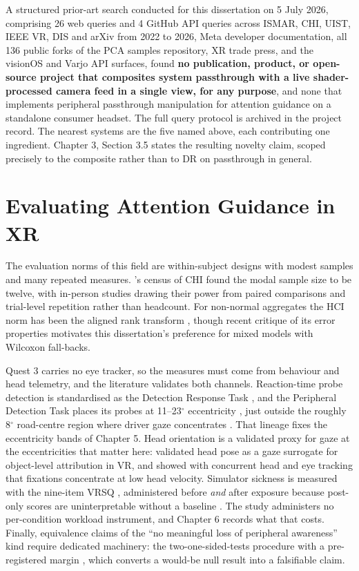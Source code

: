 A structured prior-art search conducted for this dissertation on 5 July 2026, comprising 26 web
queries and 4 GitHub API queries across ISMAR, CHI, UIST, IEEE VR, DIS and arXiv from 2022 to 2026,
Meta developer documentation, all 136 public forks of the PCA samples repository, XR trade press, and
the visionOS and Varjo API surfaces, found \textbf{no publication, product, or open-source project
that composites system passthrough with a live shader-processed camera feed in a single view, for any
purpose}, and none that implements peripheral passthrough manipulation for attention guidance on a
standalone consumer headset. The full query protocol is archived in the project record. The nearest
systems are the five named above, each contributing one ingredient. Chapter 3, Section 3.5 states the
resulting novelty claim, scoped precisely to the composite rather than to DR on passthrough in
general.

\section{Evaluating Attention Guidance in XR}

The evaluation norms of this field are within-subject designs with modest samples and many
repeated measures. \citet{caine2016}'s census of CHI found the modal sample size to be twelve, with
in-person studies drawing their power from paired comparisons and trial-level repetition rather than
headcount. For non-normal aggregates the HCI norm has been the aligned rank transform
\citep{wobbrock2011}, though recent critique of its error properties \citep{tsandilas2024} motivates
this dissertation's preference for mixed models with Wilcoxon fall-backs.

Quest 3 carries no eye tracker, so the measures must come from behaviour and head telemetry, and the
literature validates both channels. Reaction-time probe detection is standardised as the Detection
Response Task \citep{iso2016}, and the Peripheral Detection Task places its probes at
11--23$^{\circ}$ eccentricity \citep{jahn2005}, just outside the roughly 8$^{\circ}$ road-centre
region where driver gaze concentrates \citep{victor2005}. That lineage fixes the eccentricity bands
of Chapter 5. Head orientation is a validated proxy for gaze at the eccentricities that matter here:
\citet{higgins2022} validated head pose as a gaze surrogate for object-level attribution in VR, and
\citet{sitzmann2018} showed with concurrent head and eye tracking that fixations concentrate at low
head velocity. Simulator sickness is measured with the nine-item VRSQ \citep{kim2018}, administered
before \textit{and} after exposure because post-only scores are uninterpretable without a baseline
\citep{brown2022}. The study administers no per-condition workload instrument, and Chapter 6 records
what that costs. Finally, equivalence
claims of the ``no meaningful loss of peripheral awareness'' kind require dedicated machinery: the
two-one-sided-tests procedure with a pre-registered margin \citep{lakens2017}, which converts a
would-be null result into a falsifiable claim.

